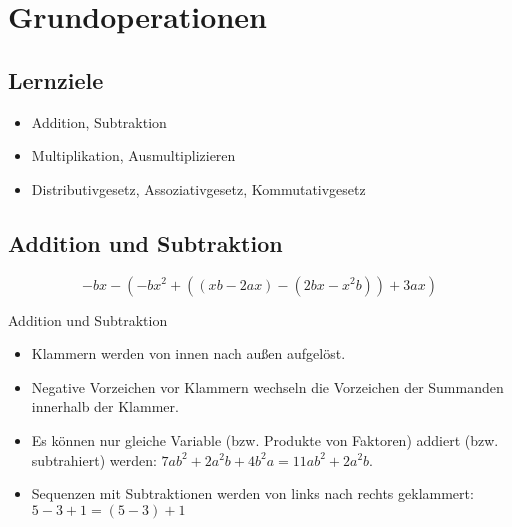 \newpage
\section{Grundoperationen}
\renewcommand{\bbwAufgabenBlockID}{A1G}

\subsection*{Lernziele}
\begin{itemize}
\item Addition, Subtraktion
\item Multiplikation, Ausmultiplizieren
\item Distributivgesetz,
  Assoziativgesetz,
  Kommutativgesetz
\end{itemize}

\newpage

\subsection{Addition und Subtraktion}
\begin{beispiel}{}{}
$$-bx-(-bx^2+((xb-2ax)-(2bx-x^2b))+3ax)$$
\end{beispiel}


\begin{rezept}{Addition und Subtraktion}{}
\begin{itemize}
\item Klammern werden von innen nach außen aufgelöst.
\item Negative Vorzeichen vor Klammern wechseln die Vorzeichen der
      Summanden innerhalb der Klammer.
\item Es können nur gleiche Variable (bzw. Produkte von Faktoren)
      addiert (bzw. subtrahiert) werden: $7ab^2 +2a^2b+4b^2a = 11ab^2 + 2a^2b$.
\item Sequenzen mit Subtraktionen werden von links
      nach rechts geklammert: $5-3+1 = (5-3) + 1$
\end{itemize}
\end{rezept}
 \newpage


